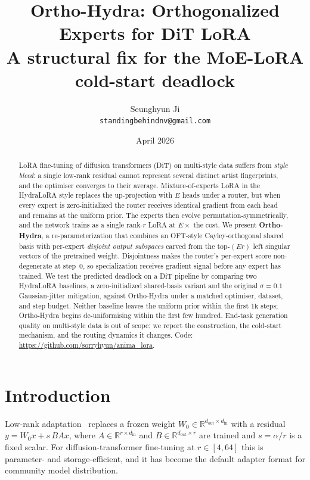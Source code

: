 \documentclass[10pt]{article}
\title{\textbf{Ortho-Hydra: Orthogonalized Experts for DiT LoRA}\\[2pt]
\large A structural fix for the MoE-LoRA cold-start deadlock}
\author{Seunghyun Ji\\\small\texttt{standingbehindnv@gmail.com}}
\date{April 2026}
\newcommand{\Rb}{\mathbb{R}}
\begin{document}
\maketitle

\begin{abstract}
LoRA fine-tuning of diffusion transformers (DiT) on multi-style data
suffers from \emph{style bleed}: a single low-rank residual cannot
represent several distinct artist fingerprints, and the optimiser
converges to their average. Mixture-of-experts LoRA in the HydraLoRA
style replaces the up-projection with $E$ heads under a router, but
when every expert is zero-initialized the router receives identical
gradient from each head and remains at the uniform prior. The
experts then evolve permutation-symmetrically, and the network trains
as a single rank-$r$ LoRA at $E{\times}$ the cost. We present
\textbf{Ortho-Hydra}, a re-parameterization that combines an OFT-style
Cayley-orthogonal shared basis with per-expert \emph{disjoint output
subspaces} carved from the top-$(Er)$ left singular vectors of the
pretrained weight. Disjointness makes the router's per-expert score
non-degenerate at step~$0$, so specialization receives gradient signal
before any expert has trained. We test the predicted
deadlock on a DiT pipeline by comparing two HydraLoRA baselines, a
zero-initialized shared-basis variant and the original
$\sigma{=}0.1$ Gaussian-jitter mitigation, against Ortho-Hydra under a
matched optimiser, dataset, and step budget. Neither baseline leaves
the uniform prior within the first $1\text{k}$ steps; Ortho-Hydra
begins de-uniformising within the first few hundred. End-task generation
quality on multi-style data is out of scope; we report the construction,
the cold-start mechanism, and the routing dynamics it changes.
Code: \url{https://github.com/sorryhyun/anima_lora}.
\end{abstract}

\section{Introduction}

Low-rank adaptation~\cite{hu2022lora} replaces a frozen weight $W_0
\in \Rb^{d_{\mathrm{out}}\times d_{\mathrm{in}}}$ with a residual
$y = W_0 x + s\,B A x$, where $A \in \Rb^{r\times d_{\mathrm{in}}}$ and
$B \in \Rb^{d_{\mathrm{out}}\times r}$ are trained and $s = \alpha/r$
is a fixed scalar. For diffusion-transformer fine-tuning at $r \in [4,
64]$ this is parameter- and storage-efficient, and it
has become the default adapter format for community model distribution.
\end{document}
